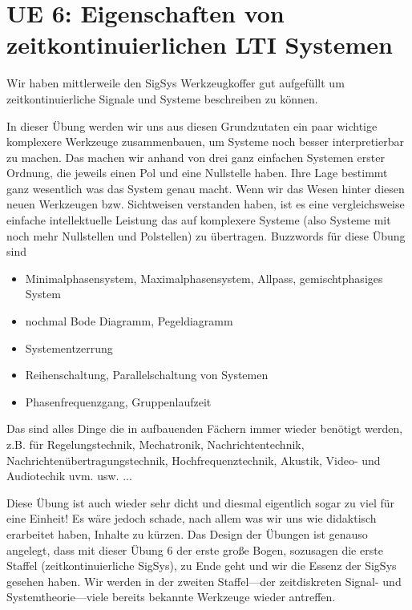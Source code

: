 \clearpage
\section{UE 6: Eigenschaften von zeitkontinuierlichen LTI Systemen}

Wir haben mittlerweile den SigSys Werkzeugkoffer gut aufgefüllt um
zeitkontinuierliche Signale und Systeme beschreiben zu können.

In dieser Übung werden wir uns aus diesen Grundzutaten ein paar wichtige
komplexere Werkzeuge zusammenbauen, um Systeme noch besser interpretierbar zu
machen. Das machen wir anhand von drei ganz einfachen Systemen erster Ordnung,
die jeweils einen Pol und eine Nullstelle haben. Ihre Lage bestimmt ganz wesentlich
was das System genau macht. Wenn wir das Wesen hinter diesen neuen Werkzeugen
bzw. Sichtweisen verstanden haben, ist es eine vergleichsweise einfache
intellektuelle Leistung das auf komplexere Systeme (also Systeme mit noch mehr Nullstellen
und Polstellen) zu übertragen.
%
Buzzwords für diese Übung sind
\begin{itemize}
  \item Minimalphasensystem, Maximalphasensystem, Allpass, gemischtphasiges System
  \item nochmal Bode Diagramm, Pegeldiagramm
  \item Systementzerrung
  \item Reihenschaltung, Parallelschaltung von Systemen
  \item Phasenfrequenzgang, Gruppenlaufzeit
\end{itemize}
Das sind alles Dinge die in aufbauenden Fächern immer wieder benötigt
werden, z.B. für Regelungstechnik, Mechatronik, Nachrichtentechnik,
Nachrichtenübertragungstechnik, Hochfrequenztechnik, Akustik,
Video- und Audiotechik uvm. usw. ...

Diese Übung ist auch wieder sehr dicht und diesmal eigentlich sogar zu viel für
eine Einheit! Es wäre jedoch schade, nach allem was wir uns wie didaktisch
erarbeitet haben, Inhalte zu kürzen. Das Design der Übungen
ist genauso angelegt, dass mit dieser Übung 6 der erste große Bogen,
sozusagen die erste Staffel (zeitkontinuierliche SigSys),
zu Ende geht und wir die Essenz der SigSys gesehen haben.
Wir werden in der zweiten Staffel---der zeitdiskreten Signal- und Systemtheorie---viele
bereits bekannte Werkzeuge wieder antreffen.

\newpage
